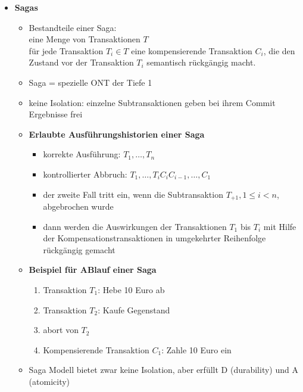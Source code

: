 \begin{itemize}
\begin{itemize}
		\item \textbf{Sagas}
		\begin{itemize}
			\item Bestandteile einer Saga:\\
			eine Menge von Transaktionen $T$\\
			für jede Transaktion $T_i \in T$ eine kompensierende Transaktion $C_i$, die den Zustand vor der Transaktion $T_i$ semantisch rückgängig macht.
			\item Saga = spezielle ONT der Tiefe 1
			\item keine Isolation: einzelne Subtransaktionen geben bei ihrem Commit Ergebnisse frei
			\item \textbf{Erlaubte Ausführungshistorien einer Saga}
			\begin{itemize}
				\item korrekte Ausführung: $T_1, \ldots, T_n$
				\item kontrollierter Abbruch: $T_1, \ldots, T_iC_iC_{i-1},\ldots, C_1$
				\item der zweite Fall tritt ein, wenn die Subtransaktion $T_{+1}, 1 \leq i < n$, abgebrochen wurde
				\item dann werden die Auswirkungen der Transaktionen $T_1$ bis $T_i$ mit Hilfe der Kompensationstransaktionen in umgekehrter Reihenfolge rückgängig gemacht
			\end{itemize}
			\item \textbf{Beispiel für ABlauf einer Saga}
			\begin{enumerate}
				\item Transaktion $T_1$: Hebe 10 Euro ab
				\item Transaktion $T_2$: Kaufe Gegenstand
				\item abort von $T_2$
				\item Kompensierende Transaktion $C_1$: Zahle 10 Euro ein
			\end{enumerate}
			\item Saga Modell bietet zwar keine Isolation, aber erfüllt D (durability) und A (atomicity)
		\end{itemize}
		

\end{itemize}
\end{itemize}
